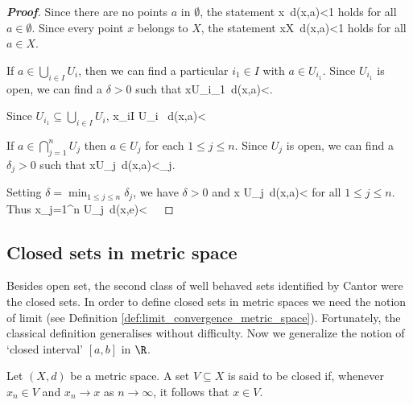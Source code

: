 \begin{proof}[\bf Proof]
\ben
\item [(i)] Since there are no points $a$ in $\emptyset$, the statement
\be
x\in \emptyset\quad {}\ d(x,a)<1
\ee
holds for all $a\in \emptyset$. Since every point $x$ belongs to $X$, the statement
\be
x\in X\quad {}\ d(x,a)<1
\ee
holds for all $a\in X$.

\item [(ii)] If $a\in \bigcup_{i\in I} U_i$, then we can find a particular $i_1\in I$ with $a\in U_{i_1}$. Since $U_{i_{1}}$ is open, we can find a $\delta>0$ such that
\be
x\in U_{i_{1}}\quad {}\ d(x,a)<\delta.
\ee

Since $U_{i_{1}}\subseteq \bigcup_{i\in I} U_i$,
\be
x\in \bigcup_{i\in I} U_i \quad {}\ d(x,a)<\delta \ \ra \ 
\ee

\item [(iii)] If $a\in \bigcap_{j=1}^{n} U_j$ then $a\in U_{j}$ for each $1\leq j\leq n$. Since $U_{j}$ is open, we can find a $\delta_{j}>0$ such that
\be
x\in U_{j}\quad {}\ d(x,a)<\delta_{j}.
\ee

Setting $\delta=\min_{1\leq j\leq n}\delta_{j}$, we have $\delta>0$ and
\be
x \in U_{j}\quad {}\ d(x,a)<\delta
\ee
for all $1\leq j\leq n$. Thus
\be
x\in \bigcap_{j=1}^{n} U_{j}\quad {}\ d(x,e)<\delta \ \ra\ 
\ee
\een
\end{proof}






\subsection{Closed sets in metric space}

Besides open set, the second class of well behaved sets identified by Cantor were the closed sets. In order to define closed sets in metric spaces we need the notion of limit (see Definition \ref{def:limit_convergence_metric_space}). Fortunately, the classical definition generalises without difficulty. Now we generalize the notion of `closed interval' $[a,b]$ in $\R$. 

\begin{definition}\label{def:closed_set_metric_space}
Let $(X,d)$ be a metric space. A set $V\subseteq X$ is said to be closed if, whenever $x_{n}\in V$ and $x_{n}\to x$ as $n\to\infty$, it follows that $x\in V$.
\end{definition}

